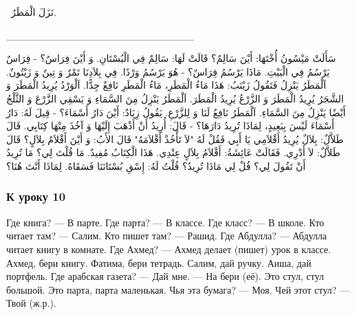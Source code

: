 \documentclass[a5paper]{article}
\begin{document}
\ نَزَلَ الْمَطَرُ.

\_\_\_\_\_\_\_\_\_\_\_\_\_\_\_\_\_\_\_\_\_\_\_\_\_\_

سَأَلَتْ مَيْسُونُ أُخْتَهَا: أَيْنَ سَالِمٌ؟ قَالَتْ لَهَا: سَالِمٌ فِي الْبُسْتَانِ. وَ أَيْنَ فِرَاسٌ؟ - فِرَاسٌ يَرْسُمُ فِي الْبَيْتِ. مَاذَا يَرْسُمُ فِرَاسٌ؟ - هُوَ يَرْسُمُ وَرْدًا. فِي بِلاَدِنَا تَمْرٌ وَ تِينٌ وَ زَيْتُونٌ. اَلْمَطَرُ يَنْزِلُ فَتَقُولُ زَيْنَبُ: هَذَا مَاءُ الْمَطَرِ، مَاءُ الْمَطَرِ نَافِعٌ جِدًّا. اَلْوَرْدُ يُرِيدُ الْمَطَرَ وَ الشَّجَرُ يُرِيدُ الْمَطَرَ وَ الزَّرْعُ يُرِيدُ الْمَطَرَ. اَلْمَطَرُ يَنْزِلُ مِنَ السَّمَاءِ وَ يَسْقِي الزَّرْعَ وَ الثَّلْجُ أَيْضًا يَنْزِلُ مِنَ السَّمَاءِ. اَلْمَطَرُ نَافِعٌ لَنَا وَ لِلزَّرْعِ. يَقُولُ زِيَادٌ: أَيْنَ دَارُ أَسْمَاءَ؟ - قِيلَ لَهُ: دَارُ أَسْمَاءَ لَيْسَ بِبَعِيدٍ، لِمَاذَا تُرِيدُ دَارَهَا؟ - قَالَ: أُرِيدُ أَنْ أَذْهَبَ إِلَيْهَا وَ آخُذَ مِنْهَا كِتَابِي. قَالَ طَلاَّلٌ: بِلاَلٌ يُرِيدُ أَقْلاَمِي يَا أَبِي فَقُلْ لَهُ "لاَ تَأْخُذْ أَقْلاَمَهُ" قَالَ الأَبُ: وَ أَيْنَ أَقْلاَمُ بِلاَلٍ؟ قَالَ طَلاَّلٌ: لاَ أَدْرِي. فَقَالَتْ عَائِشَةُ: أَقْلاَمُ بِلاَلٍ عِنْدِي. هَذَا الْكِتَابُ مُفِيدٌ. مَا قُلْتَ لِي؟ مَا تُرِيدُ أَنْ تَقُولَ لِي؟ قُلْ لِي مَاذَا تُرِيدُ؟ قُلْتُ لَهُ: إِسْقِ بُسْتَانَنَا فَسَقَاهُ. لِمَاذَا أَنْتَ هُنَا؟

\subsubsection{К уроку 10}
Где книга? — В парте. Где парта? — В классе. Где класс? — В школе. Кто читает там? — Салим. Кто пишет там? — Рашид. Где Абдулла? — Абдулла читает книгу в комнате. Где Ахмед? — Ахмед делает (пишет) урок в классе. Ахмед, бери книгу. Фатима, бери тетрадь. Салим, дай ручку. Аиша, дай портфель. Где арабская газе­та? — Дай мне. — На бери (её). Это стул, стул большой. Это парта, парта маленькая. Чья эта бумага? — Моя. Чей этот стул? — Твой (ж.р.).
\end{document}
